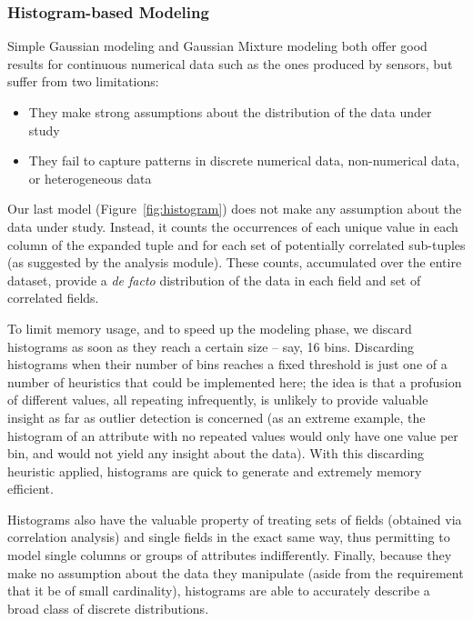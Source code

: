 \subsubsection{Histogram-based Modeling}
\label{sec:histograms}
Simple Gaussian modeling and Gaussian Mixture modeling both offer good results for continuous numerical data such as the ones produced by sensors, but suffer from two limitations:

\begin{itemize}
\item They make strong assumptions about the distribution of the data under study
\item They fail to capture patterns in discrete numerical data, non-numerical data, or heterogeneous data
\end{itemize}

Our last model (Figure~\ref{fig:histogram}) does not make any assumption about the data under study. Instead, it counts the occurrences of each unique value in each column of the expanded tuple and for each set of potentially correlated sub-tuples (as suggested by the analysis module). These counts, accumulated over the entire dataset, provide a \emph{de facto} distribution of the data in each field and set of correlated fields.

To limit memory usage, and to speed up the modeling phase, we discard histograms as soon as they reach a certain size -- say, 16 bins. Discarding histograms when their number of bins reaches a fixed threshold is just one of a number of heuristics that could be implemented here; the idea is that a profusion of different values, all repeating infrequently, is unlikely to provide valuable insight as far as outlier detection is concerned (as an extreme example, the histogram of an attribute with no repeated values would only have one value per bin, and would not yield any insight about the data). With this discarding heuristic applied, histograms are quick to generate and extremely memory efficient.

Histograms also have the valuable property of treating sets of fields (obtained via correlation analysis) and single fields in the exact same way, thus permitting to model single columns or groups of attributes indifferently. Finally, because they make no assumption about the data they manipulate (aside from the requirement that it be of small cardinality), histograms are able to accurately describe a broad class of discrete distributions.

